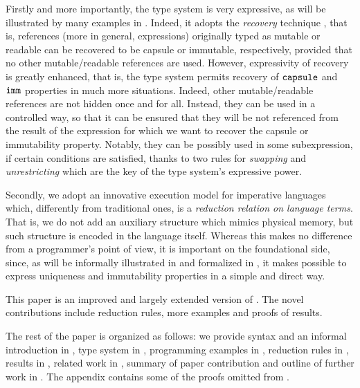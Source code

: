 {Firstly and more importantly, the type system is very expressive, as will be illustrated by many examples in . Indeed, it adopts the \emph{recovery} technique \cite{GordonEtAl12,ClebschEtAl15}, that is, references (more in general, expressions) originally typed as mutable or readable can be recovered to be capsule or immutable, respectively, provided that no other mutable/readable references are used. 
However, expressivity of recovery is greatly enhanced, that is, the type system permits recovery of $\texttt{capsule}$ and $\texttt{imm}$ properties in much more situations. Indeed,  other mutable/readable references are not hidden once and for all. Instead, they can be used in a controlled way, so that it can be ensured that they will be not referenced from the result of the expression for which we want to recover the capsule or immutability property. Notably, they can be possibly used in some subexpression, if certain conditions are satisfied, thanks to two rules for \emph{swapping} and \emph{unrestricting} which are the key of the type system's expressive power.}

Secondly, we adopt an innovative execution model \cite{ServettoLindsay13,CapriccioliEtAl15,ServettoZucca15} for imperative languages which, 
differently from traditional  ones, {is a \emph{reduction relation on language terms}. That is, we do not add an auxiliary structure which mimics 
physical memory, but such structure is encoded in the language itself.} Whereas this makes no difference from a programmer's point of view, it is important on the foundational side, since, as will be {informally illustrated in  and formalized in , it makes possible to express %
uniqueness and immutability properties in a simple and direct way. }

This paper is an improved and largely extended version of \cite{GianniniEtAl16}. The novel contributions include reduction rules, more examples and proofs of results.

The rest of the paper is organized as follows: we provide syntax and an informal introduction in , type system in ,  {programming} examples in , reduction rules in ,  results in , 
related work in , summary of paper contribution and outline of further work in . 
The appendix contains some of the proofs omitted from .
